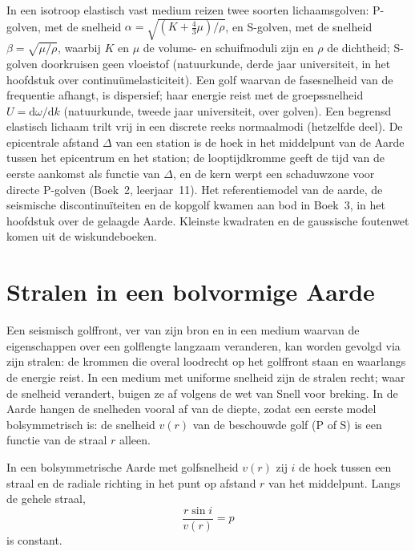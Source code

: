 \begin{recall}
In een isotroop elastisch vast medium reizen twee soorten lichaamsgolven: P-golven, met de
snelheid $\alpha = \sqrt{(K + \tfrac43\mu)/\rho}$, en S-golven, met de
snelheid $\beta = \sqrt{\mu/\rho}$, waarbij $K$ en $\mu$ de volume- en schuifmoduli zijn
en $\rho$ de dichtheid; S-golven doorkruisen geen vloeistof (natuurkunde, derde
jaar universiteit, in het hoofdstuk over continuümelasticiteit). Een golf waarvan de fasesnelheid
van de frequentie afhangt, is dispersief; haar energie reist met de
groepssnelheid $U = \mathrm d\omega/\mathrm dk$ (natuurkunde, tweede jaar universiteit, over
golven). Een begrensd elastisch lichaam trilt vrij in een discrete reeks
normaalmodi (hetzelfde deel). De epicentrale afstand $\Delta$ van een station is de hoek
in het middelpunt van de Aarde tussen het epicentrum en het station; de
looptijdkromme geeft de tijd van de eerste aankomst als functie van $\Delta$, en de kern werpt een
schaduwzone voor directe P-golven (Boek~2, leerjaar~11). Het referentiemodel van de aarde,
de seismische discontinuïteiten en de kopgolf kwamen aan bod in Boek~3,
in het hoofdstuk over de gelaagde Aarde. Kleinste kwadraten en de gaussische
foutenwet komen uit de wiskundeboeken.
\end{recall}

\section{Stralen in een bolvormige Aarde}

Een seismisch golffront, ver van zijn bron en in een medium waarvan de eigenschappen
over een golflengte langzaam veranderen, kan worden gevolgd via zijn stralen: de krommen
die overal loodrecht op het golffront staan en waarlangs de energie reist. In een
medium met uniforme snelheid zijn de stralen recht; waar de snelheid verandert,
buigen ze af volgens de wet van Snell voor breking. In de Aarde hangen de snelheden
vooral af van de diepte, zodat een eerste model bolsymmetrisch is: de snelheid $v(r)$ van de
beschouwde golf (P of S) is een functie van de straal $r$ alleen.

\begin{theorem}\label{thm:b3:seismology-imaging:snell}
In een bolsymmetrische Aarde met golfsnelheid $v(r)$ zij $i$ de hoek
tussen een straal en de radiale richting in het punt op afstand $r$ van het middelpunt. Langs de gehele straal,
\[
  \frac{r\sin i}{v(r)} = p
\]
is constant.
\end{theorem}


